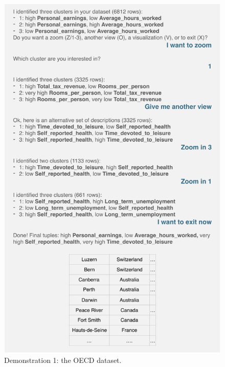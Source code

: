 \begin{figure}[t!]
  \centering
  \includegraphics[width=\columnwidth]{Experiments/UseCaseFull}
  \caption{Demonstration 1: the OECD dataset.}
  \label{fig:UseCase1}
\end{figure}

